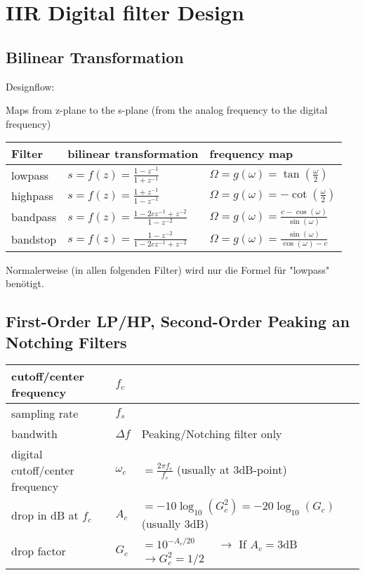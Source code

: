 \section{IIR Digital filter Design}
\subsection{Bilinear Transformation}
Designflow:
\begin{center}

\end{center}
Maps from z-plane to the s-plane (from the analog frequency to the digital
frequency)

\begin{tabularx}{\textwidth}{|l|X|X|}
	\hline
	\textbf{Filter} & \textbf{bilinear transformation} & \textbf{frequency map}
	\\ \hline
	lowpass & 
	$s = f(z) = \frac{1 - z^{-1}}{1 + z^{-1}}$ &
	$ \Omega = g(\omega) = \tan(\frac{\omega}{2})$
	\\ \hline
	highpass & 
	$s = f(z) = \frac{1 + z^{-1}}{1 - z^{-1}}$ &
	$ \Omega = g(\omega) = - \cot(\frac{\omega}{2})$
	\\ \hline
	bandpass & 
	$s = f(z) = \frac{1 - 2cz^{-1} +z^{-2}}{1 - z^{-2}}$ &
	$ \Omega = g(\omega) = \frac{c - \cos(\omega)}{\sin(\omega)}$
	\\ \hline
	bandstop & 
	$s = f(z) = \frac{1 - z^{-2}}{1 - 2cz^{-1} + z^{-2}}$ &
	$ \Omega = g(\omega) = \frac{\sin(\omega)}{\cos(\omega) - c}$ 
	\\ \hline
\end{tabularx}
\vspace{1em}

Normalerweise (in allen folgenden Filter) wird nur die Formel für "lowpass" benötigt. 

\subsection{First-Order LP/HP, Second-Order Peaking an Notching Filters}
\begin{tabular}{|l|l|l|}
	\hline
	cutoff/center frequency & $f_c$ &
	\\ \hline
	sampling rate & $f_s$ &
	\\ \hline
	bandwith & $\Delta f$ & Peaking/Notching filter only
	\\ \hline
	digital cutoff/center frequency & $\omega_c$ & $ = \frac{2\pi f_c}{f_s}$ \qquad (usually at 3dB-point)
	\\ \hline
	drop in dB at $f_c$ & $A_c$ & $= -10\log_{10}(G_c^2) = -20\log_{10}(G_c)$ \qquad (usually 3dB)
	\\ \hline
	drop factor & $G_c$ & $=10^{-A_c/20} \qquad \longrightarrow $ If $A_c = 3$dB $\rightarrow G_c^2 = 1/2$
	\\ \hline
\end{tabular}


